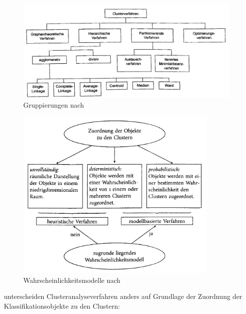 \newpage %

\begin{figure}[h]
	\begin{center}
		\includegraphics[width=14cm]{pics/backhaus476.png}
	\end{center}
	\caption{Gruppierungen nach \citet[S. 476]{Backhaus.2016}}
	\label{pic:backhaus476}
\end{figure}

\begin{figure}[h]
	\begin{center}
		\includegraphics[width=10cm]{pics/bac20.png}
	\end{center}
	\caption{Wahrscheinlichkeitsmodelle nach \citet[S. 20]{Bacher.2010}}
	\label{pic:bac20}
\end{figure}

\citet[S. 18]{Bacher.2010} unterscheiden Clusteranalyseverfahren anders auf Grundlage der Zuordnung der Klassifikationsobjekte zu den Clustern:

